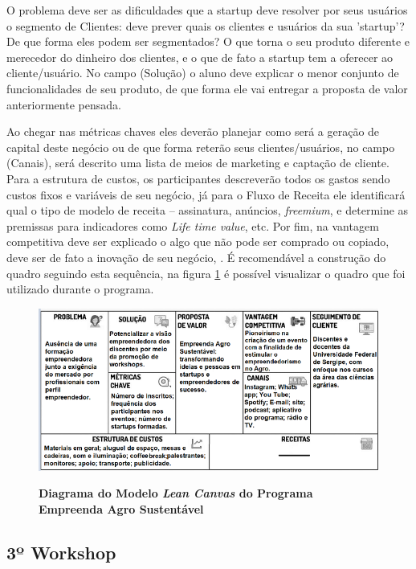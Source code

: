O problema deve ser as dificuldades que a startup deve resolver por seus usuários o segmento de Clientes: deve prever quais os clientes e usuários da sua ’startup’? De que forma eles podem ser segmentados? O que torna o seu produto diferente e merecedor do dinheiro dos clientes, e o que de fato a startup tem a oferecer ao cliente/usuário. No campo (Solução) o aluno deve explicar o menor conjunto de funcionalidades de seu produto, de que forma ele vai entregar a proposta de valor anteriormente pensada. 

Ao chegar nas métricas chaves eles deverão planejar como será a geração de capital deste negócio ou de que forma reterão seus clientes/usuários, no campo (Canais), será descrito uma lista de meios de marketing e captação de cliente. Para a estrutura de custos, os participantes descreverão todos os gastos sendo custos fixos e variáveis de seu negócio, já para o Fluxo de Receita ele identificará qual o tipo de modelo de receita – assinatura, anúncios, \textit{freemium}, e determine as premissas para indicadores como \textit{Life time value}, etc. Por fim, na vantagem competitiva deve ser explicado o algo que não pode ser comprado ou copiado, deve ser de fato a inovação de seu negócio, \cite{maurya_running_2012, sebrae_aprenda_2019}. É recomendável a construção do quadro seguindo esta sequência, na figura \ref{figura_7} é possível visualizar o quadro que foi utilizado durante o programa. 



\begin{figure}[h!]
\centering
\caption{\textbf{Diagrama do Modelo  \textit{Lean Canvas} do Programa Empreenda Agro Sustentável}}
\includegraphics[scale=0.9]{Imagens/canvas.png}
\label{figura_7}
\end{figure}
\newpage

\subsection{3º Workshop}
 
